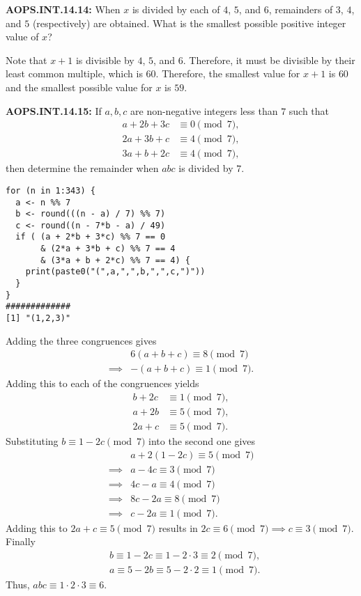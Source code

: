 \documentclass[11pt]{article}
\newenvironment{uzdevums}[1][\unskip]{%
\vspace{3mm}
\noindent
\textbf{#1:}
\noindent}
{}
\begin{document}
\begin{uzdevums}[AOPS.INT.14.14]
When $x$ is divided by each of $4$, $5$, and $6$, remainders of $3$, $4$, and $5$ (respectively) are obtained. What is the smallest possible positive integer value of $x$?
\end{uzdevums}


Note that $x+1$ is divisible by $4$, $5$, and $6$. Therefore, it must be divisible by their least common multiple, which is $60$. Therefore, the smallest value for $x+1$ is $60$ and the smallest possible value for $x$ is $\boxed{59}$.



\begin{uzdevums}[AOPS.INT.14.15]
If $a,b,c$ are non-negative integers less than $7$ such that \begin{align*}
a+2b+3c&\equiv 0\pmod 7,\\
2a+3b+c&\equiv 4\pmod 7,\\
3a+b+2c&\equiv 4\pmod 7,
\end{align*}then determine the remainder when $abc$ is divided by $7$.
\end{uzdevums}

\begin{verbatim}
for (n in 1:343) {
  a <- n %% 7
  b <- round(((n - a) / 7) %% 7)
  c <- round((n - 7*b - a) / 49)
  if ( (a + 2*b + 3*c) %% 7 == 0 
       & (2*a + 3*b + c) %% 7 == 4 
       & (3*a + b + 2*c) %% 7 == 4) {
    print(paste0("(",a,",",b,",",c,")"))
  }
}
#############
[1] "(1,2,3)"
\end{verbatim}


Adding the three congruences gives \begin{align*}
&6(a+b+c)\equiv 8\pmod 7\\
\implies& -(a+b+c) \equiv 1\pmod 7.
\end{align*}Adding this to each of the congruences yields \begin{align*}
b+2c&\equiv 1\pmod 7,\\
a+2b&\equiv 5\pmod 7,\\
2a+c&\equiv 5\pmod 7.
\end{align*}Substituting $b\equiv 1-2c\pmod 7$ into the second one gives \begin{align*}
&a+2(1-2c)\equiv 5\pmod 7\\
\implies&a-4c\equiv 3\pmod 7\\
\implies&4c-a\equiv 4\pmod 7\\
\implies&8c-2a\equiv 8\pmod 7\\
\implies&c-2a\equiv 1\pmod 7.
\end{align*}Adding this to $2a+c\equiv 5\pmod 7$ results in $2c\equiv 6\pmod 7\implies c\equiv 3\pmod 7$. Finally \begin{align*}
&b\equiv 1-2c\equiv 1-2\cdot 3\equiv 2\pmod 7,\\
&a\equiv 5-2b\equiv 5-2\cdot 2\equiv 1\pmod 7.
\end{align*}Thus, $abc\equiv 1\cdot 2\cdot 3\equiv \boxed{6}$.
\end{document}
